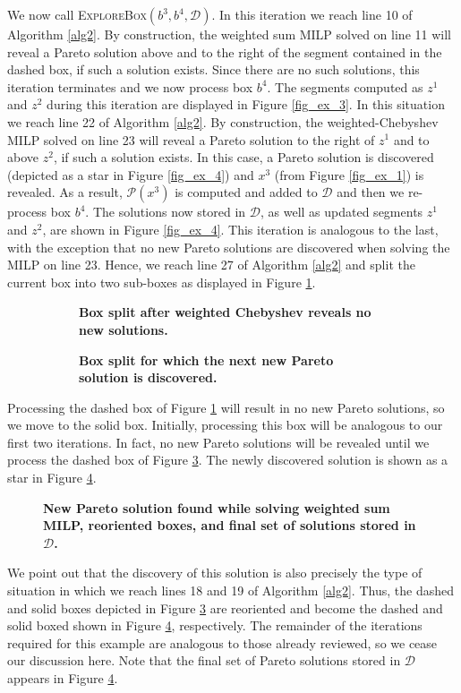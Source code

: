 \documentclass[12pt]{article}
\begin{document}
We now call \textsc{ExploreBox}$(b^3,b^4,\mathscr{D})$. In this iteration we reach line 10 of Algorithm \ref{alg2}. By construction, the weighted sum MILP solved on line 11 will reveal a Pareto solution above and to the right of the segment contained in the dashed box, if such a solution exists. Since there are no such solutions, this iteration terminates and we now process box $b^4$. The segments computed as $z^1$ and $z^2$ during this iteration are displayed in Figure \ref{fig_ex_3}. In this situation we reach line 22 of Algorithm \ref{alg2}. By construction, the weighted-Chebyshev MILP solved on line 23 will reveal a Pareto solution to the right of $z^1$ and to above $z^2$, if such a solution exists. In this case, a Pareto solution is discovered (depicted as a star in Figure \ref{fig_ex_4}) and $x^3$ (from Figure \ref{fig_ex_1}) is revealed. As a result, $\mathcal{P}(x^3)$ is computed and added to $\mathscr{D}$ and then we re-process box $b^4$. The solutions now stored in $\mathscr{D}$, as well as updated segments $z^1$ and $z^2$, are shown in Figure \ref{fig_ex_4}. This iteration is analogous to the last, with the exception that no new Pareto solutions are discovered when solving the MILP on line 23. Hence, we reach line 27 of Algorithm \ref{alg2} and split the current box into two sub-boxes as displayed in Figure \ref{fig_ex_5}. 
\begin{figure}[h!]
\begin{subfigure}[h]{.2\textwidth}
\centering
\caption{\textbf{Box split after weighted Chebyshev reveals no new solutions.}}\label{fig_ex_5}
\end{subfigure}\hfill%
\begin{subfigure}[h]{.2\textwidth}
\centering
\caption{\textbf{Box split for which the next new Pareto solution is discovered.}}\label{fig_ex_6}
\end{subfigure}
\caption{}
\end{figure}
Processing the dashed box of Figure \ref{fig_ex_5} will result in no new Pareto solutions, so we move to the solid box. Initially, processing this box will be analogous to our first two iterations. In fact, no new Pareto solutions will be revealed until we process the dashed box of Figure \ref{fig_ex_6}. The newly discovered solution is shown as a star in Figure \ref{fig_ex_7}. 
\begin{figure}[h!]
\centering
\caption{\textbf{New Pareto solution found while solving weighted sum MILP, reoriented boxes, and final set of solutions stored in $\mathscr{D}$.}}\label{fig_ex_7}
\end{figure}
We point out that the discovery of this solution is also precisely the type of situation in which we reach lines 18 and 19 of Algorithm \ref{alg2}. Thus, the dashed and solid boxes depicted in Figure \ref{fig_ex_6} are reoriented and become the dashed and solid boxed shown in Figure \ref{fig_ex_7}, respectively. The remainder of the iterations required for this example are analogous to those already reviewed, so we cease our discussion here. Note that the final set of Pareto solutions stored in $\mathscr{D}$ appears in Figure \ref{fig_ex_7}.
\end{document}
